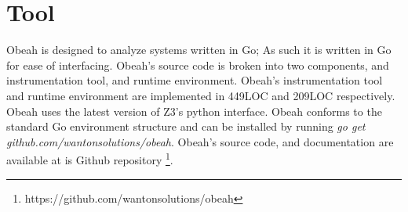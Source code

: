 \section{Tool}
\label{sec:tool}

Obeah is designed to analyze systems written in Go; As such it is written in Go
for ease of interfacing. Obeah's source code is broken into two components, and
instrumentation tool, and runtime environment. Obeah's instrumentation tool and
runtime environment are implemented in 449LOC and 209LOC respectively. Obeah
uses the latest version of Z3's python interface. Obeah conforms to the
standard Go environment structure and can be installed by running \emph{go get
github.com/wantonsolutions/obeah}. Obeah's source code, and documentation are
available at is Github repository
\footnote{https://github.com/wantonsolutions/obeah}.

